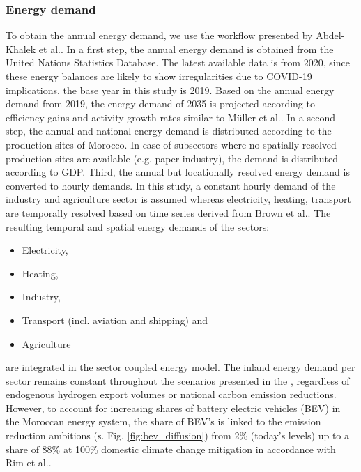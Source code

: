 \subsubsection*{Energy demand}
To obtain the annual energy demand, we use the workflow presented by Abdel-Khalek et al.\cite{Abdel-Khalek2024}. In a first step, the annual energy demand is obtained from the United Nations Statistics Database\cite{unstats2023}. The latest available data is from 2020, since these energy balances are likely to show irregularities due to COVID-19 implications, the base year in this study is 2019. Based on the annual energy demand from 2019, the energy demand of 2035 is projected according to efficiency gains and activity growth rates similar to M{\"u}ller et al.\cite{Muller2023}.
In a second step, the annual and national energy demand is distributed according to the production sites of Morocco. %
In case of subsectors where no spatially resolved production sites are available (e.g. paper industry), the demand is distributed according to GDP. %
Third, the annual but locationally resolved energy demand is converted to hourly demands. In this study, a constant hourly demand of the industry and agriculture sector is assumed whereas electricity, heating, transport are temporally resolved based on time series derived from Brown et al.\cite{Brown2018a}. The resulting temporal and spatial energy demands of the sectors:
\begin{itemize}
    \item Electricity,
    \item Heating,
    \item Industry,
    \item Transport (incl. aviation and shipping) and
    \item Agriculture
\end{itemize}
are integrated in the sector coupled energy model. The inland energy demand per sector remains constant throughout the scenarios presented in the , regardless of endogenous hydrogen export volumes or national carbon emission reductions. However, to account for increasing shares of battery electric vehicles (BEV) in the Moroccan energy system, the share of BEV's is linked to the emission reduction ambitions (s. Fig. \ref{fig:bev_diffusion}) from 2\% (today's levels) up to a share of 88\% at 100\% domestic climate change mitigation in accordance with Rim et al.\cite{Rim2021}.




